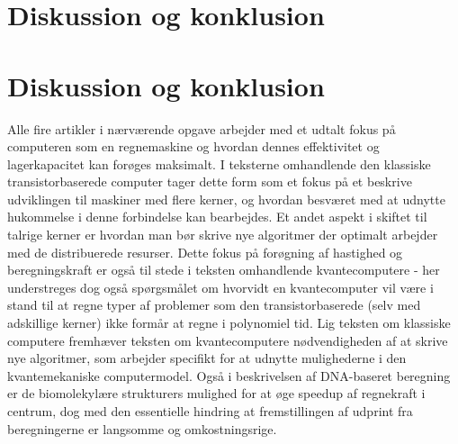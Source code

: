 \documentclass[10pt,a4paper]{article}
\begin{document}
\section{Diskussion og konklusion}
\section{Diskussion og konklusion}
Alle fire artikler i nærværende opgave arbejder med et udtalt fokus på
computeren som en regnemaskine og hvordan dennes effektivitet og lagerkapacitet kan 
forøges maksimalt. I teksterne omhandlende den klassiske transistorbaserede
computer tager dette form som et fokus på et beskrive udviklingen til maskiner
med flere kerner, og hvordan besværet med at udnytte hukommelse i denne forbindelse
kan bearbejdes. Et andet aspekt i skiftet til talrige kerner er hvordan man bør
skrive nye algoritmer der optimalt arbejder med de distribuerede resurser. 
Dette fokus på forøgning af hastighed og beregningskraft er også til stede i
teksten omhandlende kvantecomputere - her understreges dog også spørgsmålet om 
hvorvidt en kvantecomputer vil være i stand til at regne typer af problemer som 
den transistorbaserede (selv med adskillige kerner) ikke formår at regne i 
polynomiel tid. Lig teksten om klassiske computere fremhæver teksten om 
kvantecomputere nødvendigheden af at skrive nye algoritmer, som arbejder 
specifikt for at udnytte mulighederne i den kvantemekaniske computermodel. 
Også i beskrivelsen af DNA-baseret beregning er de biomolekylære strukturers
mulighed for at øge speedup af regnekraft i centrum, dog med den essentielle
hindring at fremstillingen af udprint fra beregningerne er langsomme og 
omkostningsrige. 
\end{document}
